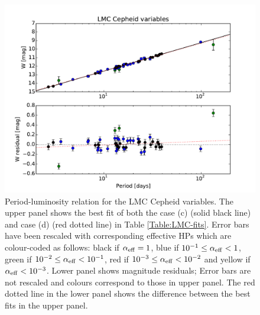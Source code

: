 \begin{figure}[tbp]
\centering %
\includegraphics[scale=0.75]{figures/chapter-h0/effective_HP_cepheids_LMC.pdf} 
\caption{Period-luminosity relation for the LMC Cepheid variables. The upper panel shows the best fit of both the case (c) (solid black line) and case (d) (red dotted line) in Table \ref{Table:LMC-fits}. Error bars have been rescaled with corresponding effective HPs which are colour-coded as follows: black if $\alpha_{\mathrm{eff}} = 1$, blue if $10^{-1}\leq \alpha_{\mathrm{eff}} < 1$, green if $10^{-2}\leq \alpha_{\mathrm{eff}} < 10^{-1}$, red if  $10^{-3} \leq \alpha_{\mathrm{eff}} < 10^{-2}$ and yellow if $\alpha_{\mathrm{eff}} < 10^{-3}$. Lower panel shows magnitude residuals; Error bars are not rescaled and colours correspond to those in upper panel. The red dotted line in the lower panel shows the difference between the best fits in the upper panel.}
\label{Fig:LMC-Cepheid-variables-fit-c}
\end{figure}

